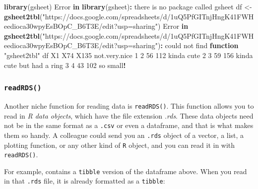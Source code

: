 \documentclass[
]{book}
\newenvironment{Shaded}{\begin{snugshade}}{\end{snugshade}}
\newcommand{\ControlFlowTok}[1]{\textcolor[rgb]{0.13,0.29,0.53}{\textbf{#1}}}
\newcommand{\DecValTok}[1]{\textcolor[rgb]{0.00,0.00,0.81}{#1}}
\newcommand{\FunctionTok}[1]{\textcolor[rgb]{0.13,0.29,0.53}{\textbf{#1}}}
\newcommand{\NormalTok}[1]{#1}
\newcommand{\OtherTok}[1]{\textcolor[rgb]{0.56,0.35,0.01}{#1}}
\newcommand{\SpecialCharTok}[1]{\textcolor[rgb]{0.81,0.36,0.00}{\textbf{#1}}}
\newcommand{\StringTok}[1]{\textcolor[rgb]{0.31,0.60,0.02}{#1}}
\begin{document}
\begin{Shaded}
\begin{Highlighting}[]
\FunctionTok{library}\NormalTok{(gsheet)}
\NormalTok{Error }\ControlFlowTok{in} \FunctionTok{library}\NormalTok{(gsheet)}\SpecialCharTok{:}\NormalTok{ there is no package called }\StringTok{\textquotesingle{}gsheet\textquotesingle{}}
\NormalTok{df }\OtherTok{\textless{}{-}} \FunctionTok{gsheet2tbl}\NormalTok{(}\StringTok{"https://docs.google.com/spreadsheets/d/1uQ5PfGITnjHngK41FWHeedioca30wpyEsBOpC\_B6T3E/edit?usp=sharing"}\NormalTok{)}
\NormalTok{Error }\ControlFlowTok{in} \FunctionTok{gsheet2tbl}\NormalTok{(}\StringTok{"https://docs.google.com/spreadsheets/d/1uQ5PfGITnjHngK41FWHeedioca30wpyEsBOpC\_B6T3E/edit?usp=sharing"}\NormalTok{)}\SpecialCharTok{:}\NormalTok{ could not find }\ControlFlowTok{function} \StringTok{"gsheet2tbl"}
\NormalTok{df}
\NormalTok{  X1 X74 X135             not.very.nice}
\DecValTok{1}  \DecValTok{2}  \DecValTok{56}  \DecValTok{112}\NormalTok{                kinda cute}
\DecValTok{2}  \DecValTok{3}  \DecValTok{59}  \DecValTok{156}\NormalTok{ kinda cute but had a ring}
\DecValTok{3}  \DecValTok{4}  \DecValTok{43}  \DecValTok{102}\NormalTok{                 so small}\SpecialCharTok{!}
\end{Highlighting}
\end{Shaded}

\subsubsection*{\texorpdfstring{\texttt{readRDS()}}{readRDS()}}\label{readrds}

Another niche function for reading data is \texttt{readRDS()}. This function allows you to read in \emph{R data objects}, which have the file extension \emph{.rds}. These data objects need not be in the same format as a \texttt{.csv} or even a dataframe, and that is what makes them so handy. A colleague could send you an \texttt{.rds} object of a vector, a list, a plotting function, or any other kind of \texttt{R} object, and you can read it in with \texttt{readRDS()}.

For example, contains a \texttt{tibble} version of the dataframe above. When you read in that \texttt{.rds} file, it is already formatted as a \texttt{tibble}:
\end{document}
